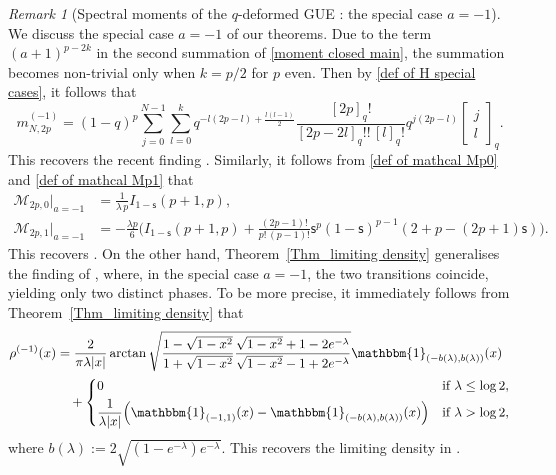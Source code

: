 \documentclass{amsart}
\newcommand{\qbinom}[2]{{\begin{bmatrix}#1\\#2\end{bmatrix}}_q}
\theoremstyle{plain}
\theoremstyle{remark}
\newtheorem{rem}{Remark}
\numberwithin{equation}{section}
\begin{document}
\begin{rem}[Spectral moments of the $q$-deformed GUE \cite{BFO24}: the special case $a=-1$] 
We discuss the special case $a=-1$ of our theorems. Due to the term $(a+1)^{p-2k}$ in the second summation of \eqref{moment closed main}, the summation becomes non-trivial only when $k=p/2$ for $p$ even. Then by \eqref{def of H special cases}, it follows that 
\begin{equation}
m_{N,2p}^{ (-1) } =   (1-q)^p \sum_{j=0}^{N-1}    \sum_{l=0}^k     q^{-l(2p-l)+\frac{l(l-1)}{2}}\frac{[2p]_{q}!}{[2p-2l]_{q}!! \, [l]_{q}!} q^{j(2p-l)}\qbinom{j}{l}.
\end{equation}
This recovers the recent finding \cite[Theorem 2.1]{BFO24}.  
Similarly, it follows from \eqref{def of mathcal Mp0} and \eqref{def of mathcal Mp1} that 
\begin{align}
\mathcal{M}_{2p,0}\Big|_{ a=-1 } &= \frac{1}{\lambda\, p}  I_{1-\mathsf{s} }(p+1,p),
\\
 \mathcal{M}_{2p,1}\Big|_{ a=-1 }  &=-\frac{\lambda p}{6}
          \bigg(  I_{1-\mathsf{s}  }(p+1,p)
        +\frac{(2p-1)!}{p!\,(p-1)!}  \mathsf{s}^{p} (1-\mathsf{s}  )^{p-1}(2+p-(2p+1) \mathsf{s} )\bigg).  
\end{align}
This recovers \cite[Theorem 2.3]{BFO24}.
On the other hand, Theorem~\ref{Thm_limiting density} generalises the finding of \cite[Theorem 2.6]{BFO24}, where, in the special case $a = -1$, the two transitions coincide, yielding only two distinct phases. To be more precise, it immediately follows from Theorem~\ref{Thm_limiting density} that  
\begin{align}
\begin{split}
\rho^{(-1)}(x) &= \frac{2}{ \pi \lambda |x| } \arctan \sqrt{ \frac{ 1-\sqrt{1-x^2} }{ 1+\sqrt{1-x^2}  }  \frac{ \sqrt{1-x^2}+1-2e^{-\lambda}  }{  \sqrt{1-x^2}-1+2e^{-\lambda}  }  }   \mathbbm{1}_{(-b(\lambda),b(\lambda))}(x) 
\\
&\quad +
\begin{cases}
0 &\textup{if } \lambda \le \log 2,
\smallskip 
\\
\displaystyle 
\frac{1}{\lambda |x|} \Big( \mathbbm{1}_{ (-1,1) }(x) -\mathbbm{1}_{ (-b(\lambda),b(\lambda)) }(x) \Big) &\textup{if } \lambda > \log 2 ,
\end{cases}
\end{split}
\end{align}
where $b(\lambda) :=  2 \sqrt{ (1-e^{ -\lambda }) e^{-\lambda} } $.  
This recovers the limiting density in \cite[Theorem 2.6]{BFO24}. 
\end{rem}
\end{document}
